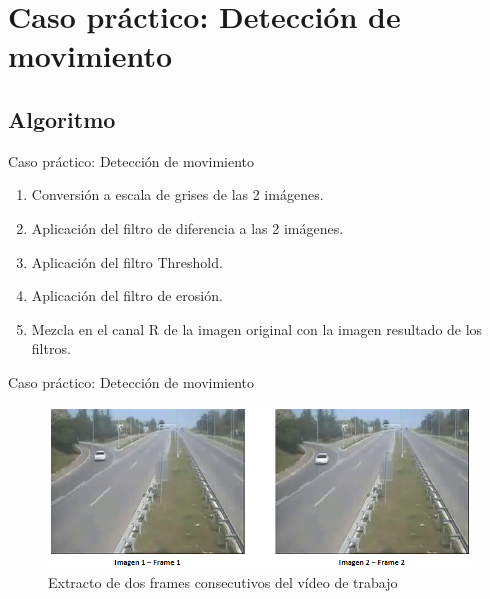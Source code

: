 \documentclass{beamer}
\begin{document}
\section{Caso práctico: Detección de movimiento}

\subsection{Algoritmo}

\begin{frame}{Caso práctico: Detección de movimiento}
\begin{enumerate}
   \item Conversión a escala de grises de las 2 imágenes.
   \item Aplicación del filtro de diferencia a las 2 imágenes.
   \item Aplicación del filtro Threshold.
   \item Aplicación del filtro de erosión.
   \item Mezcla en el canal R de la imagen original con la imagen resultado de los filtros.
\end{enumerate}
\end{frame}

\begin{frame}{Caso práctico: Detección de movimiento}
  \begin{figure}
    \begin{center}
      \includegraphics[width=.8\textwidth]{frames.png}
      \caption{Extracto de dos frames consecutivos del vídeo de trabajo}
    \end{center}
  \end{figure}
\end{frame}
\end{document}
